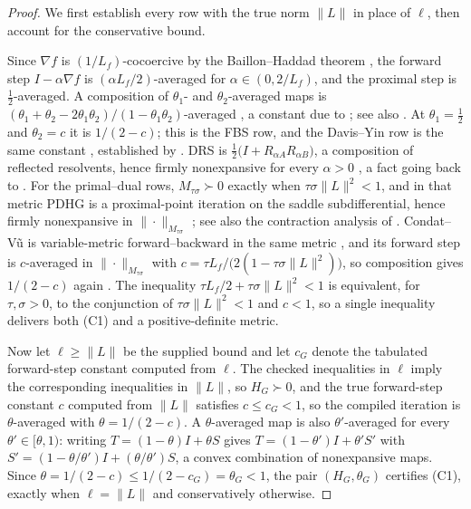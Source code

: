 \begin{proof}
We first establish every row with the true norm $\|L\|$ in place of
$\ell$, then account for the conservative bound.

Since $\nabla f$ is $(1/L_f)$-cocoercive by the Baillon--Haddad theorem
\citep{BaillonHaddad1977Quelques}, the forward step $I-\alpha\nabla f$ is
$(\alpha L_f/2)$-averaged for $\alpha\in(0,2/L_f)$, and the proximal step is
$\tfrac12$-averaged. A composition of $\theta_1$- and $\theta_2$-averaged
maps is $(\theta_1+\theta_2-2\theta_1\theta_2)/(1-\theta_1\theta_2)$-averaged
\citep[Theorem~27]{RyuYin2022LargeScale}, a constant due to
\citet{OguraYamada2002Nonstrictly}; see also
\citet{CombettesYamada2015Compositions}. At $\theta_1=\tfrac12$ and
$\theta_2=c$ it is $1/(2-c)$; this is the FBS row, and the Davis--Yin row is
the same constant \citep[Theorem~28]{RyuYin2022LargeScale}, established by
\citet{DavisYin2017Three}. DRS is
$\tfrac12\bigl(I+R_{\alpha A}R_{\alpha B}\bigr)$, a composition of reflected
resolvents, hence firmly nonexpansive for every $\alpha>0$
\citep[\S2.7]{RyuYin2022LargeScale}, a fact going back to
\citet{LionsMercier1979Splitting}. For the primal--dual rows,
$M_{\tau\sigma}\succ0$ exactly when $\tau\sigma\|L\|^2<1$, and in that metric
PDHG \citep{ChambollePock2011First} is a proximal-point iteration on the
saddle subdifferential, hence firmly nonexpansive in
$\|\cdot\|_{M_{\tau\sigma}}$ \citep[\S3.3]{RyuYin2022LargeScale}; see also
the contraction analysis of \citet{HeYuan2012Convergence}. Condat--V\~u
\citep{Condat2013Primal,Vu2013Splitting} is variable-metric
forward--backward in the same metric \citep{CombettesVu2014Variable}, and its
forward step is $c$-averaged in $\|\cdot\|_{M_{\tau\sigma}}$ with
$c=\tau L_f/\bigl(2(1-\tau\sigma\|L\|^2)\bigr)$, so composition gives
$1/(2-c)$ again \citep[\S3.3]{RyuYin2022LargeScale}. The inequality
$\tau L_f/2+\tau\sigma\|L\|^2<1$ is equivalent, for $\tau,\sigma>0$, to the
conjunction of $\tau\sigma\|L\|^2<1$ and $c<1$, so a single inequality
delivers both (C1) and a positive-definite metric.

Now let $\ell\geq\|L\|$ be the supplied bound and let $c_G$ denote the
tabulated forward-step constant computed from $\ell$. The checked
inequalities in $\ell$ imply the corresponding inequalities in $\|L\|$, so
$H_G\succ0$, and the true forward-step constant $c$ computed from $\|L\|$
satisfies $c\leq c_G<1$, so the compiled iteration is $\theta$-averaged with
$\theta=1/(2-c)$. A $\theta$-averaged map is also $\theta'$-averaged for
every $\theta'\in[\theta,1)$: writing $T=(1-\theta)I+\theta S$ gives
$T=(1-\theta')I+\theta'S'$ with $S'=(1-\theta/\theta')I+(\theta/\theta')S$,
a convex combination of nonexpansive maps. Since
$\theta=1/(2-c)\leq1/(2-c_G)=\theta_G<1$, the pair $(H_G,\theta_G)$
certifies (C1), exactly when $\ell=\|L\|$ and conservatively otherwise.


\end{proof}
